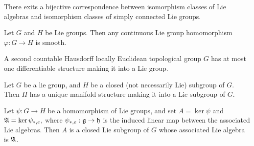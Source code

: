 \begin{corollary}
    There exits a bijective correspondence between isomorphism classes of Lie algebras and isomorphism classes of simply connected Lie groups.
\end{corollary}

\begin{theorem}
    Let $G$ and $H$ be Lie groups. Then any continuous Lie group homomorphism $\varphi:G \to H$ is smooth.
\end{theorem}

\begin{corollary}
    A second countable Hausdorff locally Euclidean topological group $G$ has at most one differentiable structure making it into a Lie group.
\end{corollary}

\begin{theorem}
    Let $G$ be a lie group, and $H$ be a closed (not necessarily Lie) subgroup of $G$. Then $H$ has a unique manifold structure making it into a Lie subgroup of $G$.
\end{theorem}

\begin{theorem}
    Let $\psi:G \to H$ be a homomorphism of Lie groups, and set $A = \ker \psi$ and $\mathfrak{A} = \ker \psi_{\ast,e}$, where $\psi_{\ast,e}:\mathfrak{g} \to \mathfrak{h}$ is the induced linear map between the associated Lie algebras. Then $A$ is a closed Lie subgroup of $G$ whose associated Lie algebra is $\mathfrak{A}$.
\end{theorem}

